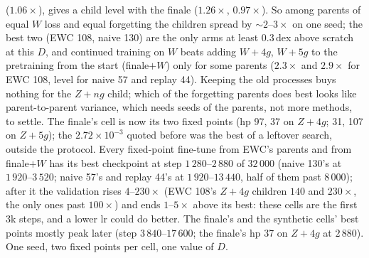 \documentclass[11pt]{article}
\begin{document}
($1.06\times$), gives a child level with the finale ($1.26\times$, $0.97\times$). So among parents of equal $W$ loss and
equal forgetting the children spread by $\sim\!2$--$3\times$ on one seed; the best two (EWC 108, naive 130) are the only
arms at least $0.3$\,dex above scratch at this $D$, and continued training on $W$ beats adding $W+4g$, $W+5g$ to the
pretraining from the start (finale$+W$) only for some parents ($2.3\times$ and $2.9\times$ for EWC 108, level for naive 57
and replay 44). Keeping the old processes buys nothing for the $Z+ng$ child; which of the forgetting parents does best
looks like parent-to-parent variance, which needs seeds of the parents, not more methods, to settle. The finale's cell is now its two fixed points
(hp 97, 37 on $Z+4g$; 31, 107 on $Z+5g$); the $2.72\times10^{-3}$ quoted before was the best of a leftover search, outside
the protocol. Every fixed-point fine-tune from EWC's parents and from finale$+W$ has its best
checkpoint at step $1\,280$--$2\,880$ of $32\,000$ (naive 130's at $1\,920$--$3\,520$; naive 57's and replay 44's at $1\,920$--$13\,440$, half of them past
$8\,000$); after it the validation rises $4$--$230\times$ (EWC 108's $Z+4g$
children $140$ and $230\times$, the only ones past $100\times$) and ends $1$--$5\times$ above its best: these cells are the
first $3$k steps, and a lower lr could do better. The finale's and the synthetic cells' best points mostly peak later (step $3\,840$--$17\,600$; the finale's hp 37 on
$Z+4g$ at $2\,880$). One seed, two fixed points per cell, one value of $D$.
\end{document}
